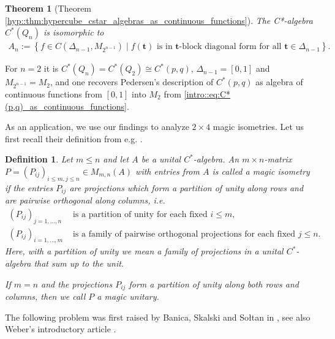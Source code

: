 \documentclass[a4paper]{amsart}
\newtheorem{definition}[thm]{Definition}
\newtheorem{introthm}{Theorem}
\begin{document}
\begin{introthm}[Theorem \ref{hyp::thm:hypercube_cstar_algebras_as_continuous_functions}]
    The C*-algebra $C^\ast(Q_n)$ is isomorphic to
    \begin{align*}
        A_n := \left\{ f \in C(\Delta_{n-1}, M_{2^{n-1}}) \mid f(\mathbf{t}) \text{ is in } \mathbf{t}\text{-block diagonal form for all } \mathbf{t} \in \Delta_{n-1} \right\}.
    \end{align*}
\end{introthm}
For $n=2$ it is $C^\ast(Q_n) = C^\ast(Q_2) \cong C^\ast(p,q)$, $\Delta_{n-1} = [0,1]$ and $M_{2^{n-1}} = M_2$, and one recovers Pedersen's description of $C^\ast(p,q)$ as algebra of continuous functions from $[0,1]$ into $M_2$ from \eqref{intro::eq:C*(p,q)_as_continuous_functions}.

As an application, we use our findings to analyze $2 \times 4$ magic isometries. Let us first recall their definition from e.g. \cite[Definition 5.1]{banica_noncommutative_2012}.

\begin{definition} 
    \label{intro::def:magic_isometry_unitary}
    Let $m \leq n$ and let $A$ be a unital $C^\ast$-algebra. An $m \times n$-matrix $P = (P_{ij})_{i \leq m, j \leq n} \in M_{m,n}(A)$ with entries from $A$ is called a \emph{magic isometry} if the entries $P_{ij}$ are projections which form a partition of unity along rows and are pairwise orthogonal along columns, i.e.
    \begin{align*}
        (P_{ij})_{j=1, \dots, n} &\text{ is a partition of unity for each fixed } i \leq m, \\
        (P_{ij})_{i=1, \dots, m} &\text{ is a family of pairwise orthogonal projections for each fixed } j \leq n.
    \end{align*} 
    Here, with a partition of unity we mean a family of projections in a unital $C^\ast$-algebra that sum up to the unit. 
    
    If $m = n$ and the projections $P_{ij}$ form a partition of unity along both rows and columns, then we call $P$ a \emph{magic unitary}.
\end{definition}

The following problem was first raised by Banica, Skalski and So\l tan in \cite[Section 5]{banica_noncommutative_2012}, see also Weber's introductory article \cite[Problem 3.4]{weber_quantum_2023}.
\end{document}
